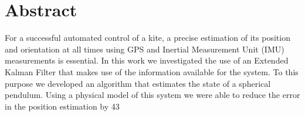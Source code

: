 \chapter*{Abstract}

For a successful automated control of a kite, a precise estimation of its position and orientation at all times using GPS and Inertial Measurement Unit (IMU) measurements is essential. In this work we investigated the use of an Extended Kalman Filter that makes use of the information available for the system. To this purpose we developed an algorithm that estimates the state of a spherical pendulum. Using a physical model of this system we were able to reduce the error in the position estimation by 43%















